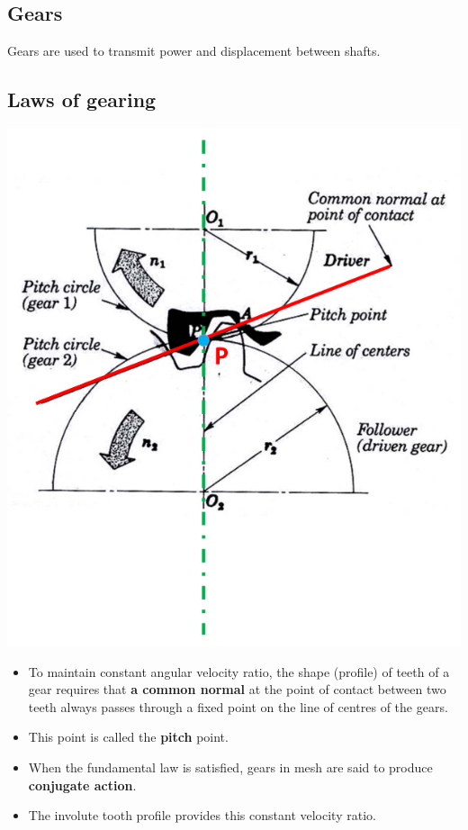 \documentclass[11pt]{article}
\begin{document}
\subsection{Gears}
\label{sec:org87d771b}
Gears are used to transmit power and displacement between shafts.
\subsection{Laws of gearing}
\label{sec:org026d9d0}
\begin{center}
\includegraphics[width=.9\linewidth]{./images/common-normal-at-point-of-contact.png}
\end{center}
\begin{itemize}
\item To maintain constant angular velocity ratio, the shape (profile) of teeth of a gear requires that \textbf{a common normal} at the point of contact between two teeth always passes through a fixed point on the line of centres of the gears.
\item This point is called the \textbf{pitch} point.
\item When the fundamental law is satisfied, gears in mesh are said to produce \textbf{conjugate action}.
\item The involute tooth profile provides this constant velocity ratio.
\end{itemize}
\end{document}
